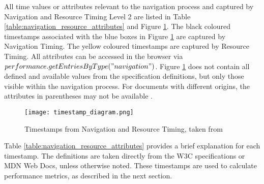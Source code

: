 All time values or attributes relevant to the navigation process and captured by Navigation and Resource Timing Level 2 are listed in Table \ref{table:navigation_resource_attributes} and Figure \ref{figure:navigation_resource_timestamps}.
The black coloured timestamps associated with the blue boxes in Figure \ref{figure:navigation_resource_timestamps} are captured by Navigation Timing.
The yellow coloured timestamps are captured by Resource Timing.
All attributes can be accessed in the browser via $performance.getEntriesByType("navigation")$.
Figure \ref{figure:navigation_resource_timestamps} does not contain all defined and available values from the specification definitions, but only those visible within the navigation process.
For documents with different origins, the attributes in parentheses may not be available \cite{2021W3CNavigationTimingLevel2}.


\begin{figure}[h!]
\begin{center}
\texttt{[image: timestamp\_diagram.png]}
\caption[Timestamps from Navigation and Resource Timing]{Timestamps from Navigation and Resource Timing, taken from \cite{2021W3CNavigationTimingLevel2}}
\label{figure:navigation_resource_timestamps}
\end{center}
\end{figure}


Table \ref{table:navigation_resource_attributes} provides a brief explanation for each timestamp.
The definitions are taken directly from the W3C specifications or MDN Web Docs, unless otherwise noted.
These timestamps are used to calculate performance metrics, as described in the next section.


